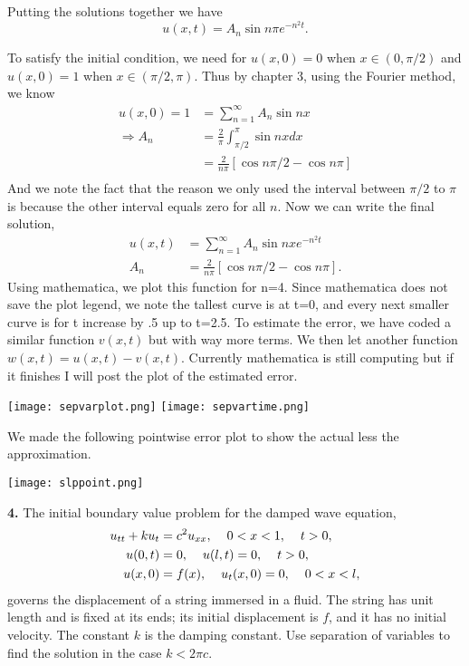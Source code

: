 \documentclass{article}
\begin{document}
Putting the solutions together we have 
\[
u(x,t)=A_n \sin n \pi e^{-n^2  t}.
 \]
 
 
To satisfy the initial condition, we need for \(u(x,0)=0 \) when \(x \in (0,\pi/2)\) and \(u(x,0) = 1 \) when \(x \in (\pi/2,\pi)\). Thus by chapter 3, using the Fourier method, we know
\begin{align*}
u(x,0) = 1 &= \sum_{n=1}^\infty A_n \sin n x \\
\Rightarrow A_n &= \frac2\pi \int_{\pi/2}^\pi \sin nx dx  \\
&= \frac2{n\pi}[ \cos n\pi/2 - \cos n\pi ]  \\
\end{align*}
And we note the fact that the reason we only used the interval between \( \pi/2 \) to \( \pi\) is because the other interval equals zero for all \(n\). Now we can write the final solution, 
\begin{align*}
u(x,t) &= \sum_{n=1}^\infty A_n \sin n x e^{-n^2 t} \\
A_n&= \frac2{n\pi}[ \cos n\pi/2 - \cos n\pi ].
\end{align*}
Using mathematica, we plot this function for n=4. Since mathematica does not save the plot legend, we note the tallest curve is at t=0, and every next smaller curve is for t increase by .5 up to t=2.5. To estimate the error, we have coded a similar function \(v(x,t)\) but with way more terms. We then let another function \(w(x,t)=u(x,t)-v(x,t)\). Currently mathematica is still computing but if it finishes I will post the plot of the estimated error.  



\vspace{9mm}

\texttt{[image: sepvarplot.png]} 
\texttt{[image: sepvartime.png]} 

\newpage

We made the following pointwise error plot to show the actual less the approximation. 

\texttt{[image: slppoint.png]}





\newpage
\textbf{4. } The initial boundary value problem for the damped wave equation, 
\begin{align}
u_{tt} + ku_t &= c^2u_{xx}, \hspace{4mm} 0<x<1, \hspace{4mm} t>0,\\
u(0,t) &= 0, \hspace{4mm} u(l,t)=0, \hspace{4mm} t>0,\\
u(x,0) &=f(x),\hspace{4mm}u_t(x,0)=0, \hspace{4mm}0<x<l,
\end{align}
governs the displacement of  a string immersed in a fluid. The string has unit length and is fixed at its ends; its initial displacement is \(f\), and it has no initial velocity. The constant \(k\) is the damping constant. Use separation of variables to find the solution in the case \(k<2\pi c\).
\end{document}
